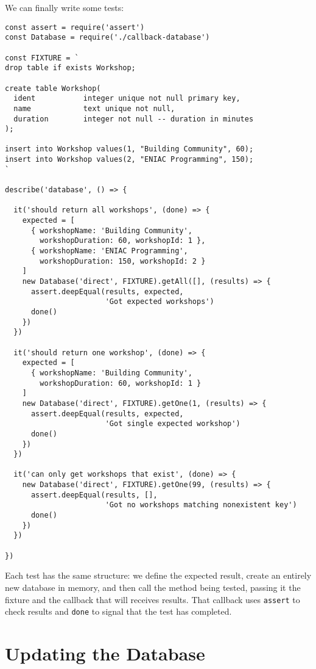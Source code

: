 We can finally write some tests:

\begin{verbatim}
const assert = require('assert')
const Database = require('./callback-database')

const FIXTURE = `
drop table if exists Workshop;

create table Workshop(
  ident           integer unique not null primary key,
  name            text unique not null,
  duration        integer not null -- duration in minutes
);

insert into Workshop values(1, "Building Community", 60);
insert into Workshop values(2, "ENIAC Programming", 150);
`

describe('database', () => {

  it('should return all workshops', (done) => {
    expected = [
      { workshopName: 'Building Community',
        workshopDuration: 60, workshopId: 1 },
      { workshopName: 'ENIAC Programming',
        workshopDuration: 150, workshopId: 2 }
    ]
    new Database('direct', FIXTURE).getAll([], (results) => {
      assert.deepEqual(results, expected,
                       'Got expected workshops')
      done()
    })
  })

  it('should return one workshop', (done) => {
    expected = [
      { workshopName: 'Building Community',
        workshopDuration: 60, workshopId: 1 }
    ]
    new Database('direct', FIXTURE).getOne(1, (results) => {
      assert.deepEqual(results, expected,
                       'Got single expected workshop')
      done()
    })
  })

  it('can only get workshops that exist', (done) => {
    new Database('direct', FIXTURE).getOne(99, (results) => {
      assert.deepEqual(results, [],
                       'Got no workshops matching nonexistent key')
      done()
    })
  })

})
\end{verbatim}

Each test has the same structure:
we define the expected result,
create an entirely new database in memory,
and then call the method being tested,
passing it the fixture and the callback that will receives results.
That callback uses \texttt{assert} to check results
and \texttt{done} to signal that the test has completed.

\section{Updating the Database}\label{s:db-mutate}

